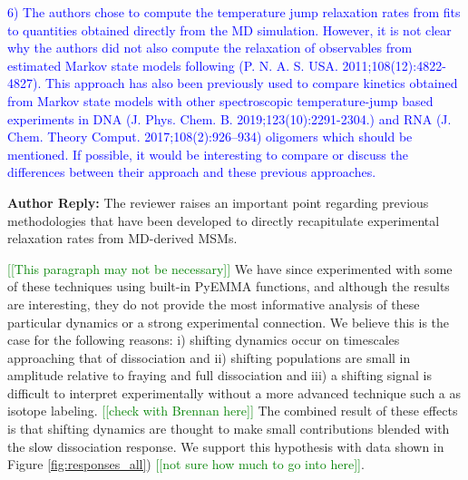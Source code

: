 \documentclass[11pt,a4paper]{letter} %
\newcommand*{\noteg}[1]{\textcolor{green}{[[#1]]}}		%
\begin{document}
\textcolor{blue}{6)       The authors chose to compute the temperature jump relaxation rates from fits to quantities obtained directly from the MD simulation. However, it is not clear why the authors did not also compute the relaxation of observables from estimated Markov state models following (P. N. A. S. USA. 2011;108(12):4822-4827). This approach has also been previously used to compare kinetics obtained from Markov state models with other spectroscopic temperature-jump based experiments in DNA (J. Phys. Chem. B. 2019;123(10):2291-2304.) and RNA (J. Chem. Theory Comput. 2017;108(2):926–934) oligomers which should be mentioned. If possible, it would be interesting to compare or discuss the differences between their approach and these previous approaches.}

\textbf{Author Reply:}   The reviewer raises an important point regarding previous methodologies that have been developed to directly recapitulate experimental relaxation rates from MD-derived MSMs.

\noteg{This paragraph may not be necessary}
We have since experimented with some of these techniques using built-in PyEMMA functions, and although the results are interesting, they do not provide the most informative analysis of these particular dynamics or a strong experimental connection. We believe this is the case for the following reasons: i) shifting dynamics occur on timescales approaching that of dissociation and ii) shifting populations are small in amplitude relative to fraying and full dissociation and iii) a shifting signal is difficult to interpret experimentally without a more advanced technique such a as isotope labeling. \noteg{check with Brennan here} The combined result of these effects is that shifting dynamics are thought to make small contributions blended with the slow dissociation response. We support this hypothesis with data shown in Figure \ref{fig:responses_all}) \noteg{not sure how much to go into here}.
\end{document}
